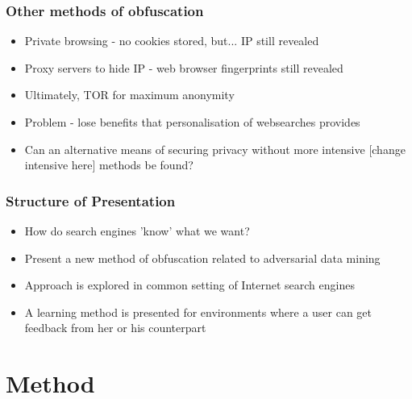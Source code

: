 \documentclass{beamer}
\begin{document}

\begin{frame}
\frametitle{Other methods of obfuscation}
\begin{itemize}
	\item Private browsing - no cookies stored, but... IP still revealed
	\item Proxy servers to hide IP - web browser fingerprints still revealed
	\item Ultimately, TOR for maximum anonymity
	\item Problem - lose benefits that personalisation of websearches provides
	\item Can an alternative means of securing privacy without more intensive [change intensive here] methods be found?
\end{itemize}
\end{frame}

\begin{frame}
\frametitle{Structure of Presentation}
\begin{itemize} %
	\item How do search engines 'know' what we want?
	\item Present a new method of obfuscation related to adversarial data mining
	\item Approach is explored in common setting of Internet search engines
	\item A learning method is presented for environments where a user can get feedback from her or his counterpart
\end{itemize}
\end{frame}

\section{Method}
\end{document}
